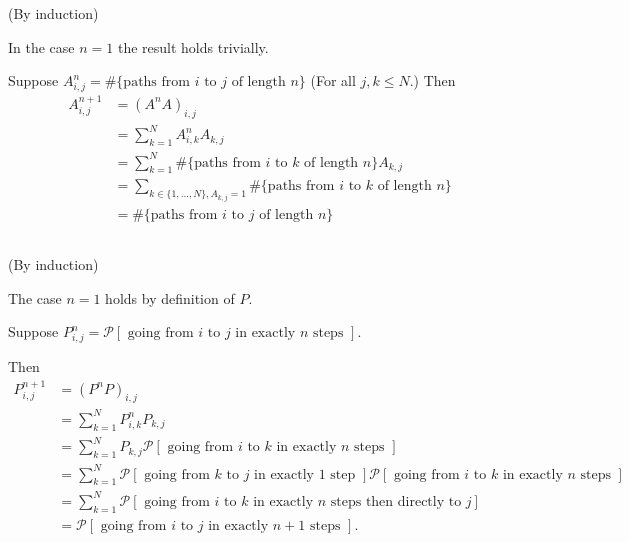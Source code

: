 \documentclass{unswmaths}
\begin{document}
\section{}
\subsection{}
(By induction)

In the case $ n = 1 $ the result holds trivially. 

Suppose $ A^n_{i,j} = \#\{ \text{paths from } i \text{ to } j \text{ of length } n \} $ (For all $ j, k \leq N $.)
Then 
\begin{align*}
    A^{n+1}_{i,j} &= (A^nA)_{i,j} \\
    &= \sum_{k=1}^N A^n_{i,k} A_{k,j} \\
    &= \sum_{k=1}^N \#\{ \text{paths from } i \text{ to } k \text{ of length } n \} A_{k,j} \\ 
    &= \sum_{k \in \{ 1, \ldots, N \}, A_{k,j} = 1 }\#\{ \text{paths from } i \text{ to } k \text{ of length } n \}  \\
    &= \#\{ \text{paths from } i \text{ to } j \text{ of length } n \} 
\end{align*}

\subsection{}
(By induction)

The case $ n = 1 $ holds by definition of $ P $.

Suppose $ P^n_{i,j} = \mathcal{P}[ \text{ going from } i \text{ to } j \text{ in exactly } n \text{ steps }]. $

Then
\begin{align*}
    P_{i,j}^{n+1} &= (P^nP)_{i,j} \\
        &= \sum_{k = 1}^N P^n_{i,k} P_{k,j} \\
        &= \sum_{k=1}^N P_{k,j} \mathcal{P}[ \text{ going from } i \text{ to } k \text{ in exactly } n \text{ steps }] \\
        &= \sum_{k=1}^N \mathcal{P}[ \text{ going from } k \text{ to } j \text{ in exactly } 1 \text{ step }] \mathcal{P}[ \text{ going from } i \text{ to } k \text{ in exactly } n \text{ steps }] \\
        &= \sum_{k=1}^N \mathcal{P}[ \text{ going from } i \text{ to } k \text{ in exactly } n \text{ steps then directly to } j] \\
        &= \mathcal{P}[ \text{ going from } i \text{ to } j \text{ in exactly } n+1 \text{ steps }].
\end{align*}
\end{document}
